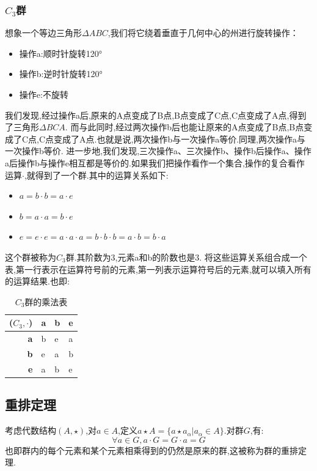 \documentclass[12pt, a4paper, oneside]{ctexbook}
\begin{document}
  \subsubsection{$C_3$群}\label{myref:C_3群}
  想象一个等边三角形$\Delta ABC$,我们将它绕着垂直于几何中心的州进行旋转操作：
  \begin{itemize}
    \item 操作a:顺时针旋转120°
    \item 操作b:逆时针旋转120°
    \item 操作e:不旋转
  \end{itemize}
  我们发现,经过操作a后,原来的A点变成了B点,B点变成了C点,C点变成了A点,得到了三角形$\Delta BCA$.
  而与此同时,经过两次操作b后也能让原来的A点变成了B点,B点变成了C点,C点变成了A点.也就是说,两次操作b与一次操作a等价.同理,两次操作a与一次操作b等价.
  进一步地,我们发现,三次操作a、三次操作b、操作b后操作a、操作a后操作b与操作e相互都是等价的.如果我们把操作看作一个集合,操作的复合看作运算$\cdot $,就得到了一个群.其中的运算关系如下:
    \begin{itemize}
    \item $a=b\cdot b=a\cdot e$
    \item $b=a\cdot a=b\cdot e$
    \item $e=e\cdot e=a\cdot a\cdot a=b\cdot b\cdot b=a\cdot b=b\cdot a$
    \end{itemize}
  这个群被称为$C_3$群.其阶数为3,元素a和b的阶数也是3.
  将这些运算关系组合成一个表,第一行表示在运算符号前的元素,第一列表示运算符号后的元素,就可以填入所有的运算结果.也即:
  \begin{table}[!h]
    \centering
    \begin{tabular}{r|lll}
         ($C_3,\cdot$) & \textbf{a} & \textbf{b} & \textbf{e} \\ \hline
        \textbf{a} & b & e & a \\ 
        \textbf{b} & e & a & b \\ 
        \textbf{e} & a & b & e \\ 
    \end{tabular}
    \caption{$C_3$群的乘法表}
    \label{C_3群的乘法表}
  \end{table}
  \subsection{重排定理}
  考虑代数结构$(A,\star)$,对$a\in A$,定义$a\star A=\{ a\star a_\alpha|a_\alpha \in A \}$.对群$G$,有:
  $$
  \forall a\in G,a\cdot G=G\cdot a=G
  $$也即群内的每个元素和某个元素相乘得到的仍然是原来的群,这被称为群的重排定理.
\end{document}
